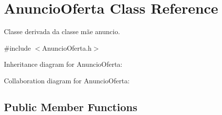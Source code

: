 \hypertarget{class_anuncio_oferta}{\section{Anuncio\+Oferta Class Reference}
\label{class_anuncio_oferta}
}


Classe derivada da classe mãe anuncio.  




{\ttfamily \#include $<$Anuncio\+Oferta.\+h$>$}



Inheritance diagram for Anuncio\+Oferta\+:


Collaboration diagram for Anuncio\+Oferta\+:
\subsection*{Public Member Functions}
